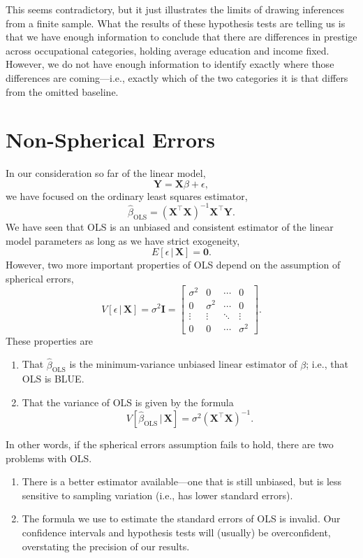 \documentclass[
  12pt,
  oneside,openany]{book}
\begin{document}
This seems contradictory, but it just illustrates the limits of drawing inferences from a finite sample. What the results of these hypothesis tests are telling us is that we have enough information to conclude that there are differences in prestige across occupational categories, holding average education and income fixed. However, we do not have enough information to identify exactly where those differences are coming---i.e., exactly which of the two categories it is that differs from the omitted baseline.

\hypertarget{nonspherical}{%
\chapter{Non-Spherical Errors}\label{nonspherical}}

In our consideration so far of the linear model,
\[
\mathbf{Y} = \mathbf{X} \beta + \epsilon,
\]
we have focused on the ordinary least squares estimator,
\[
\hat{\beta}_{\text{OLS}} = (\mathbf{X}^\top \mathbf{X})^{-1} \mathbf{X}^\top \mathbf{Y}.
\]
We have seen that OLS is an unbiased and consistent estimator of the linear model parameters as long as we have strict exogeneity,
\[
E[\epsilon \,|\, \mathbf{X}] = \mathbf{0}.
\]
However, two more important properties of OLS depend on the assumption of spherical errors,
\[
V[\epsilon \,|\, \mathbf{X}] = \sigma^2 \mathbf{I} = \begin{bmatrix}
  \sigma^2 & 0 & \cdots & 0 \\
  0 & \sigma^2 & \cdots & 0 \\
  \vdots & \vdots & \ddots & \vdots \\
  0 & 0 & \cdots & \sigma^2
\end{bmatrix}.
\]
These properties are

\begin{enumerate}
\def\labelenumi{\arabic{enumi}.}
\item
  That \(\hat{\beta}_{\text{OLS}}\) is the minimum-variance unbiased linear estimator of \(\beta\); i.e., that OLS is BLUE.
\item
  That the variance of OLS is given by the formula
  \[
  V[\hat{\beta}_{\text{OLS}} \,|\, \mathbf{X}] = \sigma^2 (\mathbf{X}^\top \mathbf{X})^{-1}.
  \]
\end{enumerate}

In other words, if the spherical errors assumption fails to hold, there are two problems with OLS.

\begin{enumerate}
\def\labelenumi{\arabic{enumi}.}
\item
  There is a better estimator available---one that is still unbiased, but is less sensitive to sampling variation (i.e., has lower standard errors).
\item
  The formula we use to estimate the standard errors of OLS is invalid. Our confidence intervals and hypothesis tests will (usually) be overconfident, overstating the precision of our results.
\end{enumerate}
\end{document}
